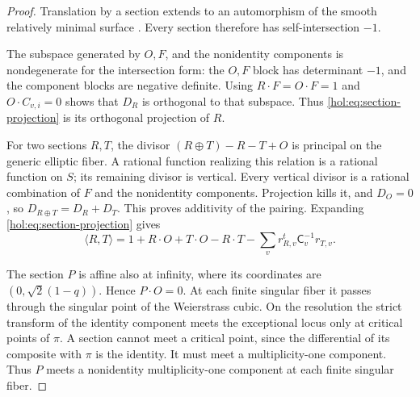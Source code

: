 \documentclass[11pt]{article}
\numberwithin{equation}{section}
\begin{document}
\begin{proof}
Translation by a section extends to an automorphism of the smooth
relatively minimal surface \cite[\S1.1]{DolgachevMartin}. Every section therefore has
self-intersection $-1$.

The subspace generated by $O,F$, and the nonidentity components is
nondegenerate for the intersection form: the $O,F$ block has
determinant $-1$, and the component blocks are negative definite.
Using $R\cdot F=O\cdot F=1$ and $O\cdot C_{v,i}=0$ shows
that $D_R$ is orthogonal to that subspace. Thus
\eqref{hol:eq:section-projection} is its orthogonal projection
of $R$.

For two sections $R,T$, the divisor
$(R\oplus T)-R-T+O$ is principal on the generic elliptic fiber.
A rational function realizing this relation is a rational function
on $S$; its remaining divisor is vertical. Every vertical divisor
is a rational combination of $F$ and the nonidentity components.
Projection kills it, and $D_O=0$, so
$D_{R\oplus T}=D_R+D_T$. This proves additivity of the pairing.
Expanding \eqref{hol:eq:section-projection} gives
\begin{equation}\label{hol:eq:height-pairing}
 \langle R,T\rangle
 =1+R\cdot O+T\cdot O-R\cdot T
    -\sum_v r_{R,v}^{t}\mathsf C_v^{-1}r_{T,v}.
\end{equation}

The section $P$ is affine also at infinity, where its coordinates
are $(0,\sqrt2(1-q))$. Hence $P\cdot O=0$.
At each finite singular fiber it passes through the singular point
of the Weierstrass cubic. On the resolution the strict transform
of the identity component meets the exceptional locus only at
critical points of $\pi$. A section cannot meet a critical point,
since the differential of its composite with $\pi$ is the identity.
It must meet a multiplicity-one component. Thus $P$
meets a nonidentity multiplicity-one component at each finite
singular fiber.


\end{proof}
\end{document}
